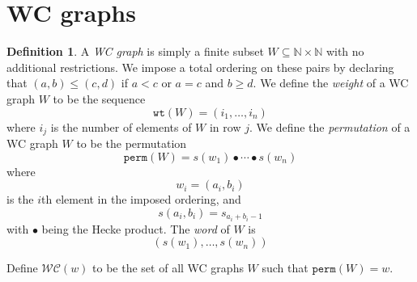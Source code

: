 \documentclass{amsart}
\newtheorem{theorem}[lemma]{Theorem}
\theoremstyle{definition}
\newtheorem{definition}[lemma]{Definition}
\theoremstyle{remark}
\numberwithin{equation}{subsection}
\newcommand{\downvar}[1]{\stackrel{#1}{\searrow}}
\newcommand{\wof}[1]{\mathtt{perm}(#1)}
\newcommand{\wtt}{\mathtt{wt}}
\newcommand{\zeromap}{\mathcal{Z}}
\newcommand{\hr}{\mathtt{ht}}
\newcommand{\BRC}{\mathcal{BRC}}
\newcommand{\WC}{\mathcal{WC}}
\newcommand{\xleadsto}[2][]{\overset{#2}{\leadsto}}
\newcommand{\ins}[2]{{#2\xleadsto{#1}}}
\begin{document}

\section{WC graphs}

\begin{definition}
A \emph{WC graph} is simply a finite subset $W\subseteq \mathbb{N}\times \mathbb{N}$ with no additional restrictions. We impose a total ordering on these pairs by declaring that $(a, b) \leq (c, d)$ if $a < c$ or $a = c$ and $b \geq d$. We define the \emph{weight} of a WC graph $W$ to be the sequence 
$$\wtt(W) = (i_1,\ldots,i_n)$$ 
where $i_j$ is the number of elements of $W$ in row $j$. We define the \emph{permutation} of a WC graph $W$ to be the permutation
$$\wof{W} = s(w_1)\bullet \cdots \bullet s(w_n)$$ 
where
$$w_i = (a_i, b_i)$$
is the $i$th element in the imposed ordering, and
$$s(a_i,b_i) = s_{a_i + b_i - 1}$$
with $\bullet$ being the Hecke product. The \emph{word} of $W$ is
$$(s(w_1),\ldots,s(w_n))$$

Define $\WC(w)$ to be the set of all WC graphs $W$ such that $\wof{W} = w$.
\end{definition}
\end{document}
